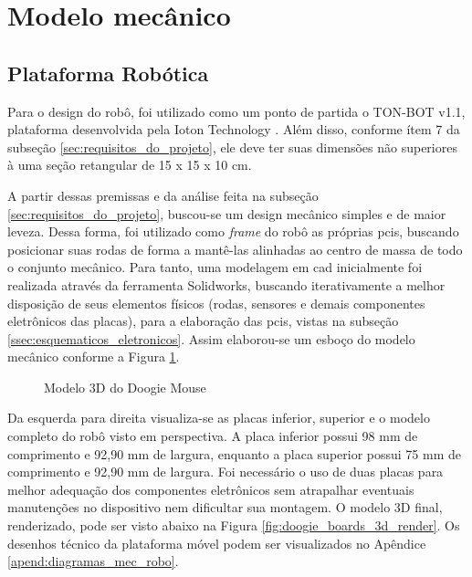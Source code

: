 \section{Modelo mecânico}
\label{sec:modelo_mecanico}

\subsection{Plataforma Robótica}
\label{ssec:plataforma_robotica}

Para o design do robô, foi utilizado como um ponto de partida o TON-BOT v1.1, plataforma desenvolvida pela Ioton Technology \cite{ioton}. Além disso, conforme ítem 7 da subseção \ref{sec:requisitos_do_projeto}, ele deve ter suas dimensões não superiores à uma seção retangular de 15 x 15 x 10 cm.

A partir dessas premissas e da análise feita na subseção \ref{sec:requisitos_do_projeto}, buscou-se um design mecânico simples e de maior leveza. Dessa forma, foi utilizado como \textit{frame} do robô as próprias \glspl*{pci}, buscando posicionar suas rodas de forma a mantê-las alinhadas ao centro de massa de todo o conjunto mecânico. Para tanto, uma modelagem em \gls*{cad} inicialmente foi realizada através da ferramenta Solidworks, buscando iterativamente a melhor disposição de seus elementos físicos (rodas, sensores e demais componentes eletrônicos das placas), para a elaboração das \glspl*{pci}, vistas na subseção \ref{ssec:esquematicos_eletronicos}. Assim elaborou-se um esboço do modelo mecânico conforme a Figura \ref{fig:doogie_boards_3d}.

\begin{figure}[H]
	\centering
	\caption{Modelo 3D do Doogie Mouse}
	\label{fig:doogie_boards_3d}
\end{figure}

Da esquerda para direita visualiza-se as placas inferior, superior e o modelo completo do robô visto em perspectiva. A placa inferior possui 98 mm de comprimento e 92,90 mm de largura, enquanto a placa superior possui 75 mm de comprimento e 92,90 mm de largura. Foi necessário o uso de duas placas para melhor adequação dos componentes eletrônicos sem atrapalhar eventuais manutenções no dispositivo nem dificultar sua montagem. O modelo 3D final, renderizado, pode ser visto abaixo na Figura \ref{fig:doogie_boards_3d_render}. Os desenhos técnico da plataforma móvel podem ser visualizados no Apêndice \ref{apend:diagramas_mec_robo}.

